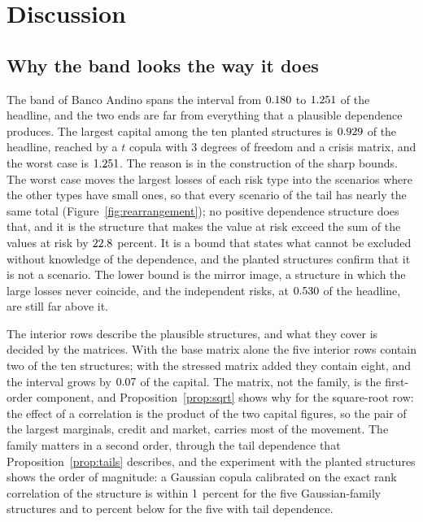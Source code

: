 \section{Discussion}
\label{sec:discussion}

\subsection{Why the band looks the way it does}
\label{sec:discussion-why}

The band of Banco Andino spans the interval from $0.180$ to $1.251$ of the headline, and the two ends are far from
everything that a plausible dependence produces. The largest capital among the ten planted structures is $0.929$
of the headline, reached by a $t$ copula with 3 degrees of freedom and a crisis matrix, and the worst case is $1.251$.
The reason is in the construction of the sharp bounds. The worst case moves the largest losses of each risk type into the
scenarios where the other types have small ones, so that every scenario of the tail has nearly the same total
(Figure~\ref{fig:rearrangement}); no positive dependence structure does that, and it is the structure that makes the value at risk
exceed the sum of the values at risk by $22.8$ percent. It is a bound that states what cannot be excluded without
knowledge of the dependence, and the planted structures confirm that it is not a scenario. The lower bound is the mirror image, a
structure in which the large losses never coincide, and the independent risks, at $0.530$ of the
headline, are still far above it.

The interior rows describe the plausible structures, and what they cover is decided by the matrices. With the base matrix alone the
five interior rows contain two of the ten structures; with the stressed matrix added they contain eight, and the interval grows
by $0.07$ of the capital. The matrix, not the family, is the first-order component, and Proposition~\ref{prop:sqrt}
shows why for the square-root row: the effect of a correlation is the product of the two capital figures, so the pair of the largest
marginals, credit and market, carries most of the movement. The family matters in a second order, through the tail dependence that
Proposition~\ref{prop:tails} describes, and the experiment with the planted structures shows the order of magnitude: a Gaussian
copula calibrated on the exact rank correlation of the structure is within $1$ percent for the five Gaussian-family structures and
\bdKTailMin{} to \bdKTailMax{} percent below for the five with tail dependence.

